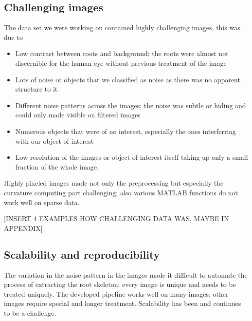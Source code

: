 

\subsection{Challenging images}\label{subsec:challengingImages}

The data set we were working on contained highly challenging images, this was due to
\begin{itemize}
	\item Low contrast between roots and background; the roots were almost not discernible for the human eye without previous treatment of the image
	\item Lots of noise or objects that we classified as noise as there was no apparent structure to it
	\item Different noise patterns across the images; the noise was subtle or hiding and could only made visible on filtered images
	\item Numerous objects that were of no interest, especially the ones interferring with our object of interest
	\item Low resolution of the images or object of interest itself taking up only a small fraction of the whole image. 
\end{itemize}
Highly pixeled images made not only the preprocessing but especially the curvature computing part challenging; also various MATLAB functions do not work well on sparse data.

[INSERT 4 EXAMPLES HOW CHALLENGING DATA WAS, MAYBE IN APPENDIX]



\subsection{Scalability and reproducibility}

The variation in the noise pattern in the images made it difficult to automate the process of extracting the root skeleton; every image is unique and needs to be treated uniquely. The developed pipeline works well on many images; other images require special and longer treatment. Scalability has been and continues to be a challenge.

